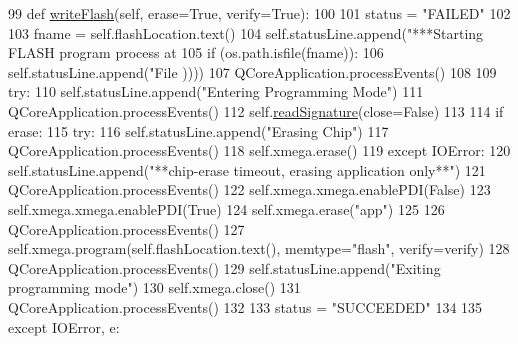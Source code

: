 \begin{DoxyCode}
99     \textcolor{keyword}{def }\hyperlink{classsoftware_1_1chipwhisperer_1_1capture_1_1utils_1_1XMEGAProgrammer_1_1XMEGAProgrammerDialog_aecff7f3f0abe19b911bcbdf0c2e787c2}{writeFlash}(self, erase=True, verify=True):
100 
101         status = \textcolor{stringliteral}{"FAILED"}
102 
103         fname = self.flashLocation.text()
104         self.statusLine.append(\textcolor{stringliteral}{"***Starting FLASH program process at %
105         \textcolor{keywordflow}{if} (os.path.isfile(fname)):
106             self.statusLine.append(\textcolor{stringliteral}{"File %
      ))))
107             QCoreApplication.processEvents()
108 
109             \textcolor{keywordflow}{try}:
110                 self.statusLine.append(\textcolor{stringliteral}{"Entering Programming Mode"})
111                 QCoreApplication.processEvents()
112                 self.\hyperlink{classsoftware_1_1chipwhisperer_1_1capture_1_1utils_1_1XMEGAProgrammer_1_1XMEGAProgrammerDialog_a44e9c93dde92824c90ca35e768a3df93}{readSignature}(close=\textcolor{keyword}{False})
113 
114                 \textcolor{keywordflow}{if} erase:
115                     \textcolor{keywordflow}{try}:
116                         self.statusLine.append(\textcolor{stringliteral}{"Erasing Chip"})
117                         QCoreApplication.processEvents()
118                         self.xmega.erase()
119                     \textcolor{keywordflow}{except} IOError:
120                         self.statusLine.append(\textcolor{stringliteral}{"**chip-erase timeout, erasing application only**"})
121                         QCoreApplication.processEvents()
122                         self.xmega.xmega.enablePDI(\textcolor{keyword}{False})
123                         self.xmega.xmega.enablePDI(\textcolor{keyword}{True})
124                         self.xmega.erase(\textcolor{stringliteral}{"app"})
125 
126                 QCoreApplication.processEvents()
127                 self.xmega.program(self.flashLocation.text(), memtype=\textcolor{stringliteral}{"flash"}, verify=verify)
128                 QCoreApplication.processEvents()
129                 self.statusLine.append(\textcolor{stringliteral}{"Exiting programming mode"})
130                 self.xmega.close()
131                 QCoreApplication.processEvents()
132                 
133                 status = \textcolor{stringliteral}{"SUCCEEDED"}
134 
135             \textcolor{keywordflow}{except} IOError, e:
}}
\end{DoxyCode}
